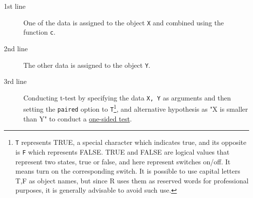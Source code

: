 \begin{description}
	\item[1st line] One of the data is assigned to the object \texttt{X} and combined using the function \texttt{c}.
	\item[2nd line] The other data is assigned to the object \texttt{Y}.
	\item[3rd line] Conducting t-test by specifying the data \texttt{X, Y} as arguments and then setting the \texttt{paired} option to \texttt{T}\footnote{\texttt{T} represents TRUE, a special character which indicates true, and its opposite is \texttt{F} which represents FALSE. TRUE and FALSE are logical values that represent two states, true or false, and here represent switches on/off. It means turn on the corresponding switch. It is possible to use capital letters T,F as object names, but since R uses them as reserved words for professional purposes, it is generally advisable to avoid such use.}, and alternative hypothesis as "X is smaller than Y" to conduct a \underline{one-sided test}.
\end{description}
